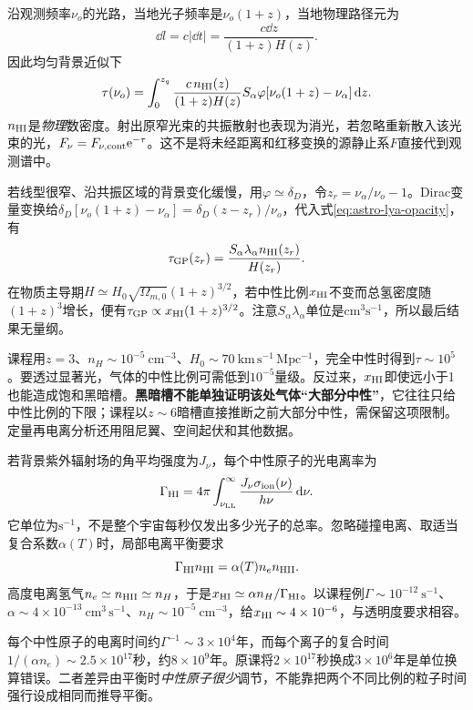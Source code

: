沿观测频率$\nu_o$的光路，当地光子频率是$\nu_o(1+z)$，当地物理路径元为
\[
 \dd l=c|\dd t|=\frac{c\dd z}{(1+z)H(z)}.
\]
因此均匀背景近似下
\begin{equation}\label{eq:astro-lya-opacity}
 \tau(\nu_o)=\int_0^{z_q}\frac{c\,n_{\rm HI}(z)}{(1+z)H(z)}
 S_\alpha\varphi[\nu_o(1+z)-\nu_\alpha]\,\mathrm d z.
\end{equation}
$n_{\rm HI}$是\emph{物理}数密度。射出原窄光束的共振散射也表现为消光，若忽略重新散入该光束的光，$F_\nu=F_{\nu,\rm cont}\mathrm e^{-\tau}$。这不是将未经距离和红移变换的源静止系$F$直接代到观测谱中。

若线型很窄、沿共振区域的背景变化缓慢，用$\varphi\simeq\delta_D$，令$z_r=\nu_\alpha/\nu_o-1$。Dirac变量变换给$\delta_D[\nu_o(1+z)-\nu_\alpha]=\delta_D(z-z_r)/\nu_o$，代入式\eqref{eq:astro-lya-opacity}，有
\begin{equation}\label{eq:astro-gp-opacity}
 \tau_{ \rm GP}(z_r)=\frac{S_\alpha\lambda_\alpha n_{\rm HI}(z_r)}{H(z_r)}.
\end{equation}
在物质主导期$H\simeq H_0\sqrt{\Omega_{m,0}}(1+z)^{3/2}$，若中性比例$x_{\rm HI}$不变而总氢密度随$(1+z)^3$增长，便有$\tau_{ \rm GP}\propto x_{\rm HI}(1+z)^{3/2}$。注意$S_\alpha\lambda_\alpha$单位是$\mathrm{cm}^3\mathrm{s}^{-1}$，所以最后结果无量纲。

课程用$z=3$、$n_H\sim10^{-5}\ \mathrm{cm}^{-3}$、$H_0\sim70\ \mathrm{km\,s^{-1}\,Mpc^{-1}}$，完全中性时得到$\tau\sim10^5$。要透过显著光，气体的中性比例可需低到$10^{-5}$量级。反过来，$x_{\rm HI}$即使远小于1也能造成饱和黑暗槽。\textbf{黑暗槽不能单独证明该处气体“大部分中性”}，它往往只给中性比例的下限；课程以$z\sim6$暗槽直接推断之前大部分中性，需保留这项限制。定量再电离分析还用阻尼翼、空间起伏和其他数据。

若背景紫外辐射场的角平均强度为$J_\nu$，每个中性原子的光电离率为
\[
 \Gamma_{ \rm HI}=4\pi\int_{\nu_{ \rm LL}}^\infty
 \frac{J_\nu\sigma_{ \rm ion}(\nu)}{h\nu}\,\mathrm d\nu.
\]
它单位为$\mathrm{s}^{-1}$，不是整个宇宙每秒仅发出多少光子的总率。忽略碰撞电离、取适当复合系数$\alpha(T)$时，局部电离平衡要求
\[
 \Gamma_{ \rm HI}n_{\rm HI}=\alpha(T)n_en_{\rm HII}.
\]
高度电离氢气$n_e\simeq n_{\rm HII}\simeq n_H$，于是$x_{\rm HI}\simeq\alpha n_H/\Gamma_{ \rm HI}$。以课程例$\Gamma\sim10^{-12}\ \mathrm{s}^{-1}$、$\alpha\sim4\times10^{-13}\ \mathrm{cm^3\,s^{-1}}$、$n_H\sim10^{-5}\ \mathrm{cm}^{-3}$，给$x_{\rm HI}\sim4\times10^{-6}$，与透明度要求相容。

每个中性原子的电离时间约$\Gamma^{-1}\sim3\times10^4$年，而每个离子的复合时间$1/(\alpha n_e)\sim2.5\times10^{17}$秒，约$8\times10^9$年。原课将$2\times10^{17}$秒换成$3\times10^6$年是单位换算错误。二者差异由平衡时\emph{中性原子很少}调节，不能靠把两个不同比例的粒子时间强行设成相同而推导平衡。


